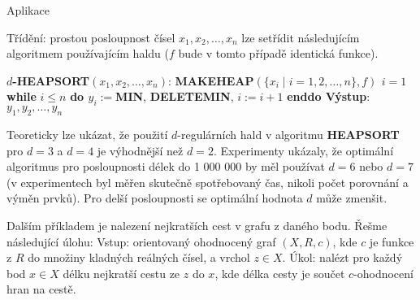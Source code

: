 \documentclass[a4paper,12pt]{article}
\begin{document}
\head
Aplikace 
\endhead

Třídění: prostou posloupnost 
čísel $x_1,x_2,\dots,x_n$ lze setřídit následujícím 
algoritmem použí\-vajícím haldu ($f$ bude v tomto případě 
identická funkce).

$d${\bf -HEAPSORT$(x_1,x_2,\dots,x_n)$}:\newline 
{\bf MAKEHEAP$(\{x_i\mid i=1,2,\dots,n\},f)$\newline 
$i=1$\newline 
while} $i\le n$ {\bf do\newline 
\phantom{{\rm ---}}$y_i:=$MIN}, {\bf DELETEMIN}, $i:=i+1$\newline 
{\bf enddo\newline 
Výstup}: $y_1,y_2,\dots,y_n$

Teoreticky lze ukázat, že použití $d$-regulárních hald v 
algoritmu {\bf HEAPSORT} pro $d=3$ a $d=4$ je výhodnější 
než $d=2$. Experimenty ukázaly, že optimální 
algoritmus pro posloupnosti délek do 1 000 000 by měl  
používat $d=6$ nebo $d=7$ (v experimentech byl měřen 
skutečně spotřebovaný čas, nikoli počet porovnání a 
výměn prvků). 
Pro delší posloupnosti se optimální 
hodnota $d$ může zmenšit.

Dalším příkladem je nalezení nejkratších cest v grafu z daného 
bodu. \v Rešme následující úlohu: \newline 
Vstup: orientovaný ohodnocený graf $(X,R,c)$, kde $c$ je funkce z $
R$ do množiny kladných 
reálných čísel, a vrchol $z\in X$.\newline 
Úkol: nalézt pro každý bod $x\in X$ délku 
nejkratší cestu ze $z$ do $x$, kde délka cesty je součet 
$c$-ohodnocení hran na cestě.
\end{document}
